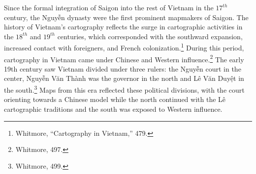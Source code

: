 \en


\begin{figure}[!ht]
\end{figure}

Since the formal integration of Saigon into the rest of Vietnam in the $17^{th}$ century, the \vi Nguyễn dynasty were the first prominent mapmakers of Saigon. The history of Vietnam’s cartography reflects the surge in cartographic activities in the $18^{th}$ and $19^{th}$ centuries, which corresponded with the southward expansion, increased contact with foreigners, and French colonization.\footnote{Whitmore, “Cartography in Vietnam,” 479.} During this period, cartography in Vietnam came under Chinese and Western influence.\footnote{Whitmore, 497.} The early 19th century saw Vietnam divided under three rulers: the Nguyễn court in the center, Nguyễn Văn Thành was the governor in the north and Lê Văn Duyệt in the south.\footnote{Whitmore, 499.} Maps from this era reflected these political divisions, with the court orienting towards a Chinese model while the north continued with the Lê cartographic traditions and the south was exposed to Western influence.

